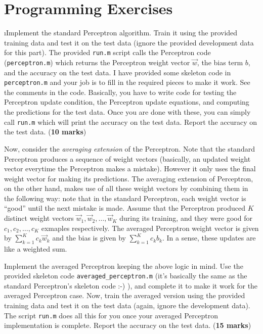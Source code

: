 \documentclass[fleqn]{article}
\begin{document}
\ene

\section{Programming Exercises}

\bee

\i Implement the standard Perceptron algorithm. Train it using
the provided training data and test it on the test data (ignore
the provided development data for this part). The provided
\texttt{run.m} script calls the Perceptron code (\texttt{perceptron.m}) 
which returns the Perceptron weight vector $\vec{w}$, the bias term 
$b$, and the accuracy on the test data. I have provided some skeleton code 
in \texttt{perceptron.m} and your job is to fill in the required 
pieces to make it work. See the comments in the code. Basically, you 
have to write code for testing the Perceptron update condition, the 
Perceptron update equations, and computing the predictions for the test 
data. Once you are done with these, you can simply call \texttt{run.m} 
which will print the accuracy on the test data. Report the accuracy on
the test data. (\textbf{10 marks})

Now, consider the \textit{averaging extension} of the Perceptron. Note that
the standard Perceptron produces a sequence of weight vectors
(basically, an updated weight vector everytime the Perceptron makes a mistake).
However it only uses the final weight vector for making its predictions.
The averaging extension of Perceptron, on the other hand, makes use of all these
weight vectors by combining them in the following way:
note that in the standard Perceptron, each weight vector is ``good'' until 
the next mistake is made. Assume that the Perceptron produced $K$ distinct 
weight vectors $\vec{w}_1,\vec{w}_2,\ldots,\vec{w}_K$ during its training, 
and they were good for $c_1,c_2,\ldots, c_K$ exmaples respectively. The 
averaged Perceptron weight vector is given by $\sum_{k=1}^K c_k \vec{w}_k$ 
and the bias is given by $\sum_{k=1}^K c_k b_k$. In a sense, these updates
are like a weighted sum.

Implement the averaged Perceptron keeping the above logic in mind. Use the
provided skeleton code \texttt{averaged\_perceptron.m} (it's basically 
the same as the standard Perceptron's skeleton
code :-) ), and complete it to make it work for the averaged 
Perceptron case. Now, train the averaged version using the provided training 
data and test it on the test data (again, ignore the development data). 
The script \texttt{run.m} does all this for you once your averaged Perceptron 
implementation is complete. Report the accuracy on the test data. (\textbf{15 marks})
\end{document}
